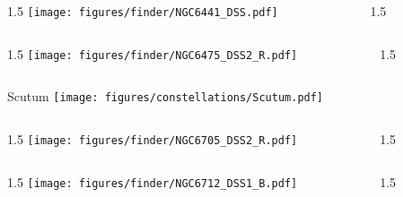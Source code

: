 \documentclass[final]{beamer}
\newlength{\colwidth}
\begin{document}

\begin{frame}[t]{}
    \begin{columns}[T]
        \begin{column}{1.5\colwidth}
            \centering
            \texttt{[image: figures/finder/NGC6441\_DSS.pdf]}
        \end{column}
        \begin{column}{1.5\colwidth}
            \Large
            
        \end{column}
    \end{columns}
    \vspace{\fill}
    \begin{columns}[T]
        \begin{column}{1.5\colwidth}
            \centering
            \texttt{[image: figures/finder/NGC6475\_DSS2\_R.pdf]}
        \end{column}
        \begin{column}{1.5\colwidth}
            \Large
            
        \end{column}
    \end{columns}
\end{frame}


\begin{frame}[t]{\LARGE Scutum}
    \centering
    \texttt{[image: figures/constellations/Scutum.pdf]}
\end{frame}


\begin{frame}[t]{}
    \begin{columns}[T]
        \begin{column}{1.5\colwidth}
            \centering
            \texttt{[image: figures/finder/NGC6705\_DSS2\_R.pdf]}
        \end{column}
        \begin{column}{1.5\colwidth}
            \Large
            
        \end{column}
    \end{columns}
    \vspace{\fill}
    \begin{columns}[T]
        \begin{column}{1.5\colwidth}
            \centering
            \texttt{[image: figures/finder/NGC6712\_DSS1\_B.pdf]}
        \end{column}
        \begin{column}{1.5\colwidth}
            \Large
            
        \end{column}
    \end{columns}
\end{frame}
\end{document}
